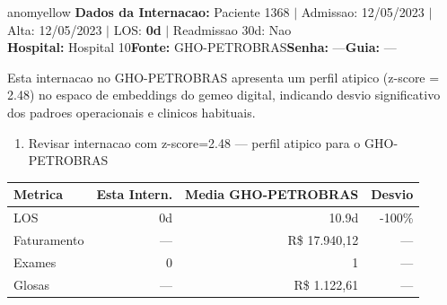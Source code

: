 \documentclass[a4paper,10pt]{article}
\begin{document}
\begin{anomalycard}[Internacao 47824 | GHO-PETROBRAS | MODERADO (z=2.48)]{anomyellow}
\textbf{Dados da Internacao:} Paciente 1368 $\mid$ Admissao: 12/05/2023 $\mid$ Alta: 12/05/2023 $\mid$ LOS: \textbf{0d} $\mid$ Readmissao 30d: Nao\\
\textbf{Hospital:} Hospital 10\quad\textbf{Fonte:} GHO-PETROBRAS\quad\textbf{Senha:} ---\quad\textbf{Guia:} ---\\
\vspace{2pt}\begin{tcolorbox}[colback=severityred!20,colframe=anomyellow,title={\textbf{Interpretacao de Negocio}},fonttitle=\bfseries\small,left=4pt,right=4pt,top=3pt,bottom=3pt]
{\small Esta internacao no GHO-PETROBRAS apresenta um perfil atipico (z-score = 2.48) no espaco de embeddings do gemeo digital, indicando desvio significativo dos padroes operacionais e clinicos habituais.}
\end{tcolorbox}
\begin{tcolorbox}[colback=severityyellow!30,colframe=anomorange,title={\textbf{Recomendacoes Especificas}},fonttitle=\bfseries\small,left=4pt,right=4pt,top=3pt,bottom=3pt]
\begin{enumerate}[nosep,leftmargin=16pt]
\item {\small Revisar internacao com z-score=2.48 --- perfil atipico para o GHO-PETROBRAS}
\end{enumerate}
\end{tcolorbox}
\begin{center}\begin{tabular}{l r r r}\toprule\textbf{Metrica} & \textbf{Esta Intern.} & \textbf{Media GHO-PETROBRAS} & \textbf{Desvio} \\\midrule
LOS & 0d & 10.9d & -100\% \\
Faturamento & --- & R\$ 17.940,12 & --- \\
Exames & 0 & 1 & --- \\
Glosas & --- & R\$ 1.122,61 & --- \\
\bottomrule\end{tabular}\end{center}


\end{anomalycard}
\end{document}
